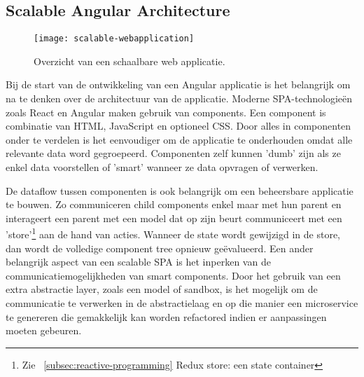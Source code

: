 \subsection{Scalable Angular Architecture}
\begin{figure}[h]
\caption{Overzicht\autocite{minko-gechev-scalable} van een schaalbare web applicatie.}
\centering
\texttt{[image: scalable-webapplication]}
\end{figure}
Bij de start van de ontwikkeling van een Angular applicatie is het belangrijk om na te denken over de architectuur \autocite{minko-gechev-scalable} van de applicatie. Moderne SPA-technologie\"en zoals React en Angular maken gebruik van components. Een component is combinatie van HTML, JavaScript en optioneel CSS. Door alles in componenten onder te verdelen is het eenvoudiger om de applicatie te onderhouden omdat alle relevante data word gegroepeerd. Componenten zelf kunnen 'dumb' zijn als ze enkel data voorstellen of 'smart' wanneer ze data opvragen of verwerken.

De dataflow tussen componenten is ook belangrijk om een beheersbare \autocite{brechtbilliet-scalable} applicatie te bouwen. Zo communiceren child components enkel maar met hun parent en interageert een parent met een model dat op zijn beurt communiceert met een 'store'\footnote{Zie ~\ref{subsec:reactive-programming} Redux store: een state container} aan de hand van acties. Wanneer de state wordt gewijzigd in de store, dan wordt de volledige component tree opnieuw ge\"evalueerd. Een ander belangrijk aspect van een scalable SPA is het inperken van de communicatiemogelijkheden van smart components. Door het gebruik van een extra abstractie layer, zoals een model of sandbox, is het mogelijk om de communicatie te verwerken in de abstractielaag en op die manier een microservice te genereren die gemakkelijk kan worden refactored indien er aanpassingen moeten gebeuren.
\clearpage
